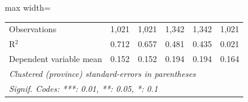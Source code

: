 \begin{adjustbox}{max width=\textwidth}
\begin{tabular}{lccccc}
      Observations                          & 1,021          & 1,021         & 1,342          & 1,342         & 1,021\\  
      R$^2$                                 & 0.712          & 0.657         & 0.481          & 0.435         & 0.021\\  
      Dependent variable mean               & 0.152          & 0.152         & 0.194          & 0.194         & 0.164\\  
      \midrule \midrule
      \multicolumn{6}{l}{\emph{Clustered (province) standard-errors in parentheses}}\\
      \multicolumn{6}{l}{\emph{Signif. Codes: ***: 0.01, **: 0.05, *: 0.1}}\\
   \end{tabular}
\end{adjustbox}
\par\endgroup


